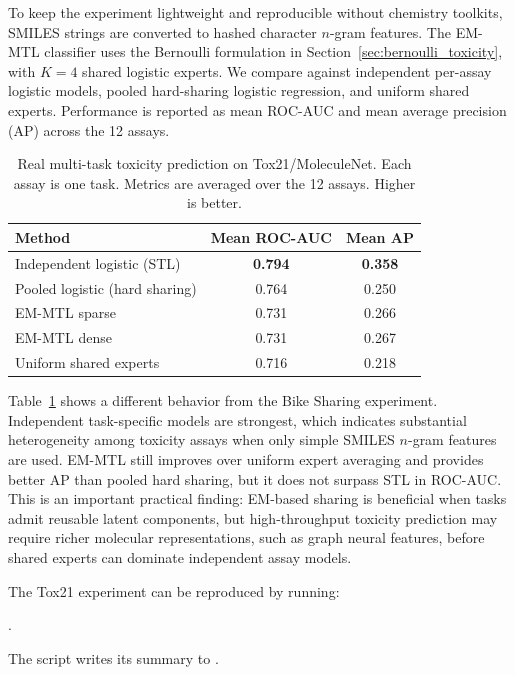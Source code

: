 \documentclass[preprint,12pt]{elsarticle}
\begin{document}
	To keep the experiment lightweight and reproducible without chemistry
	toolkits, SMILES strings are converted to hashed character $n$-gram
	features. The EM-MTL classifier uses the Bernoulli formulation in
	Section~\ref{sec:bernoulli_toxicity}, with $K=4$ shared logistic
	experts. We compare against independent per-assay logistic models,
	pooled hard-sharing logistic regression, and uniform shared experts.
	Performance is reported as mean ROC-AUC and mean average precision (AP)
	across the 12 assays.
	
	\begin{table}[t]
		\centering
		\caption{Real multi-task toxicity prediction on Tox21/MoleculeNet.
			Each assay is one task. Metrics are averaged over the 12 assays.
			Higher is better.}
		\label{tab:tox21_real_results}
		\begin{tabular}{lcc}
			\toprule
			Method & Mean ROC-AUC & Mean AP \\
			\midrule
			Independent logistic (STL) & \textbf{0.794} & \textbf{0.358} \\
			Pooled logistic (hard sharing) & 0.764 & 0.250 \\
			EM-MTL sparse & 0.731 & 0.266 \\
			EM-MTL dense & 0.731 & 0.267 \\
			Uniform shared experts & 0.716 & 0.218 \\
			\bottomrule
		\end{tabular}
	\end{table}
	
	Table~\ref{tab:tox21_real_results} shows a different behavior from the
	Bike Sharing experiment. Independent task-specific models are strongest,
	which indicates substantial heterogeneity among toxicity assays when
	only simple SMILES $n$-gram features are used. EM-MTL still improves over
	uniform expert averaging and provides better AP than pooled hard sharing,
	but it does not surpass STL in ROC-AUC. This is an important practical
	finding: EM-based sharing is beneficial when tasks admit reusable latent
	components, but high-throughput toxicity prediction may require richer
	molecular representations, such as graph neural features, before shared
	experts can dominate independent assay models.
	
	The Tox21 experiment can be reproduced by running:
	\begin{center}
	.
	\end{center}
	The script writes its summary to
	.
	
\end{document}
